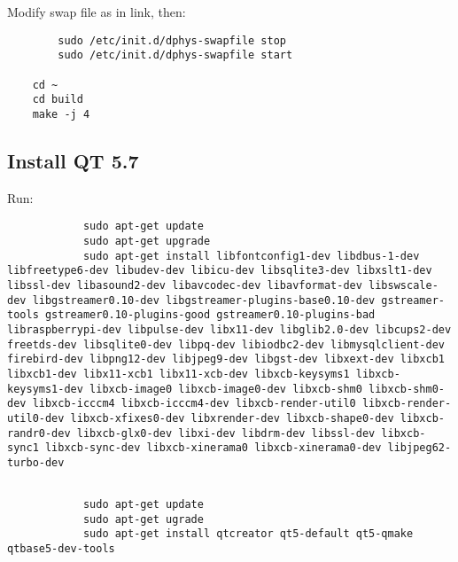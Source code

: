 \documentclass{article}
\begin{document}
		Modify swap file as in link, then:
		
		\begin{verbatim}
		sudo /etc/init.d/dphys-swapfile stop
		sudo /etc/init.d/dphys-swapfile start

	cd ~
	cd build
	make -j 4
		\end{verbatim}
		
		\subsection{Install QT 5.7}
		Run:
		\begin{verbatim}
			sudo apt-get update
			sudo apt-get upgrade
			sudo apt-get install libfontconfig1-dev libdbus-1-dev libfreetype6-dev libudev-dev libicu-dev libsqlite3-dev libxslt1-dev libssl-dev libasound2-dev libavcodec-dev libavformat-dev libswscale-dev libgstreamer0.10-dev libgstreamer-plugins-base0.10-dev gstreamer-tools gstreamer0.10-plugins-good gstreamer0.10-plugins-bad libraspberrypi-dev libpulse-dev libx11-dev libglib2.0-dev libcups2-dev freetds-dev libsqlite0-dev libpq-dev libiodbc2-dev libmysqlclient-dev firebird-dev libpng12-dev libjpeg9-dev libgst-dev libxext-dev libxcb1 libxcb1-dev libx11-xcb1 libx11-xcb-dev libxcb-keysyms1 libxcb-keysyms1-dev libxcb-image0 libxcb-image0-dev libxcb-shm0 libxcb-shm0-dev libxcb-icccm4 libxcb-icccm4-dev libxcb-render-util0 libxcb-render-util0-dev libxcb-xfixes0-dev libxrender-dev libxcb-shape0-dev libxcb-randr0-dev libxcb-glx0-dev libxi-dev libdrm-dev libssl-dev libxcb-sync1 libxcb-sync-dev libxcb-xinerama0 libxcb-xinerama0-dev libjpeg62-turbo-dev
			
		\end{verbatim}
		
		\begin{verbatim}
			sudo apt-get update
			sudo apt-get ugrade
			sudo apt-get install qtcreator qt5-default qt5-qmake qtbase5-dev-tools
		\end{verbatim}
		
		
		
		

		
	

	\begin{versionhistory}
	\end{versionhistory}
		
		
\end{document}
